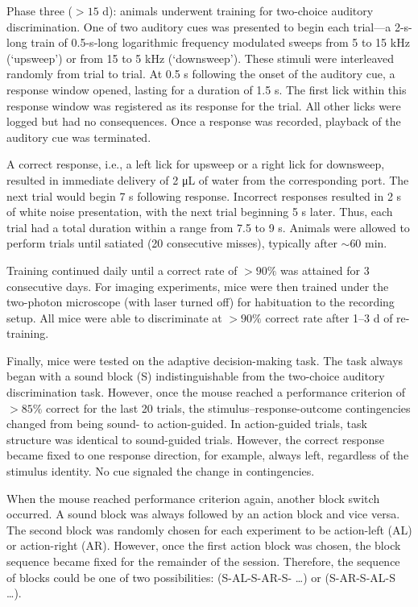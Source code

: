 Phase three ($>15$ d): animals underwent training for two-choice auditory discrimination. One of two auditory cues was presented to begin each trial---a 2-s-long train of 0.5-s-long logarithmic frequency modulated sweeps from 5 to 15 kHz (`upsweep') or from 15 to 5 kHz (`downsweep'). These stimuli were interleaved randomly from trial to trial. At 0.5 s following the onset of the auditory cue, a response window opened, lasting for a duration of 1.5 s. The first lick within this response window was registered as its response for the trial. All other licks were logged but had no consequences. Once a response was recorded, playback of the auditory cue was terminated. 

A correct response, i.e., a left lick for upsweep or a right lick for downsweep, resulted in immediate delivery of 2 \unit{\micro\liter} of water from the corresponding port. The next trial would begin 7 s following response. Incorrect responses resulted in 2 s of white noise presentation, with the next trial beginning 5 s later. Thus, each trial had a total duration within a range from 7.5 to 9 s. Animals were allowed to perform trials until satiated (20 consecutive misses), typically after $\sim 60$ min. 

Training continued daily until a correct rate of $>90\%$ was attained for 3 consecutive days. For imaging experiments, mice were then trained under the two-photon microscope (with laser turned off) for habituation to the recording setup. All mice were able to discriminate at $>90\%$ correct rate after 1--3 d of re-training. 

Finally, mice were tested on the adaptive decision-making task. The task always began with a sound block (S) indistinguishable from the two-choice auditory discrimination task. However, once the mouse reached a performance criterion of $>85\%$ correct for the last 20 trials, the stimulus–response-outcome contingencies changed from being sound- to action-guided. In action-guided trials, task structure was identical to sound-guided trials. However, the correct response became fixed to one response direction, for example, always left, regardless of the stimulus identity. No cue signaled the change in contingencies. 

When the mouse reached performance criterion again, another block switch occurred. A sound block was always followed by an action block and vice versa. The second block was randomly chosen for each experiment to be action-left (AL) or action-right (AR). However, once the first action block was chosen, the block sequence became fixed for the remainder of the session. Therefore, the sequence of blocks could be one of two possibilities: (S-AL-S-AR-S- \ldots) or (S-AR-S-AL-S \ldots). 


